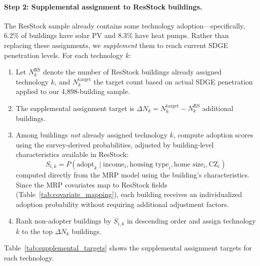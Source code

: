 \paragraph{Step 2: Supplemental assignment to ResStock buildings.}
The ResStock sample already contains some technology adoption---specifically, 6.2\% of buildings have solar PV and 8.3\% have heat pumps. Rather than replacing these assignments, we \textit{supplement} them to reach current SDGE penetration levels. For each technology $k$:

\begin{enumerate}
    \item Let $N_k^{\text{RS}}$ denote the number of ResStock buildings already assigned technology $k$, and $N_k^{\text{target}}$ the target count based on actual SDGE penetration applied to our 4,898-building sample.
    \item The supplemental assignment target is $\Delta N_k = N_k^{\text{target}} - N_k^{\text{RS}}$ additional buildings.
    \item Among buildings \textit{not} already assigned technology $k$, compute adoption scores using the survey-derived probabilities, adjusted by building-level characteristics available in ResStock:
    \begin{equation}
    S_{i,k} = P(\text{adopt}_k \mid \text{income}_i, \text{housing type}_i, \text{home size}_i, \text{CZ}_i)
    \end{equation}
    computed directly from the MRP model using the building's characteristics. Since the MRP covariates map to ResStock fields (Table~\ref{tab:covariate_mapping}), each building receives an individualized adoption probability without requiring additional adjustment factors.
    \item Rank non-adopter buildings by $S_{i,k}$ in descending order and assign technology $k$ to the top $\Delta N_k$ buildings.
\end{enumerate}

Table~\ref{tab:supplemental_targets} shows the supplemental assignment targets for each technology.

